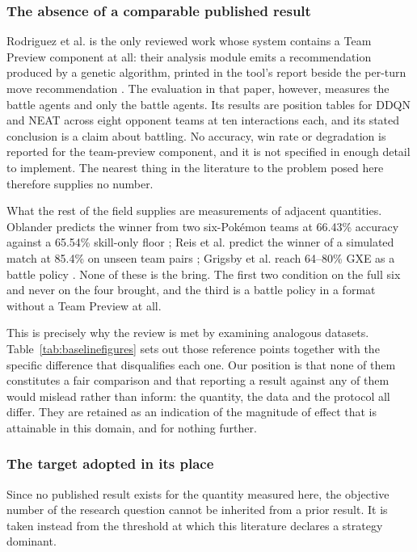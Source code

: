 \documentclass[conference]{IEEEtran}
\begin{document}
\subsubsection{The absence of a comparable published result}
Rodriguez et al. is the only reviewed work whose system contains a Team Preview
component at all: their analysis module emits a recommendation produced by a
genetic algorithm, printed in the tool's report beside the per-turn move
recommendation \cite{rodriguez2024}. The evaluation in that paper, however,
measures the battle agents and only the battle agents. Its results are position
tables for DDQN and NEAT across eight opponent teams at ten
interactions each, and its stated conclusion is a claim about battling. No accuracy, win
rate or degradation is reported for the team-preview component, and it is not
specified in enough detail to implement. The nearest thing in the literature
to the problem posed here therefore supplies no number.

What the rest of the field supplies are measurements of adjacent quantities.
Oblander predicts the winner from two six-Pok\'emon teams at 66.43\% accuracy
against a 65.54\% skill-only floor \cite{oblander2025}; Reis et al. predict the
winner of a simulated match at 85.4\% on unseen team pairs \cite{reis2024};
Grigsby et al. reach 64--80\% GXE as a battle policy \cite{grigsby2025}. None
of these is the bring. The first two condition on the full six and never on the
four brought, and the third is a battle policy in a format without a Team
Preview at all.

This is precisely why the review is met by
examining analogous datasets. Table~\ref{tab:baselinefigures} sets out those reference points
together with the specific difference that disqualifies each one. Our position
is that none of them constitutes a fair comparison and that reporting a result
against any of them would mislead rather than inform: the quantity, the data
and the protocol all differ. They are retained as an indication of the
magnitude of effect that is attainable in this domain, and for nothing further.

\subsubsection{The target adopted in its place}
\label{sec:baseline}
Since no published result exists for the quantity measured here, the objective
number of the research question cannot be inherited from a prior result. It is
taken instead from the threshold at which this literature declares a strategy
dominant.
\end{document}

